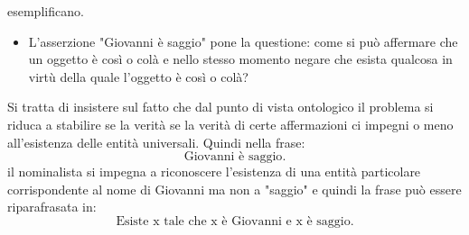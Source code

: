 \documentclass[a4paper,12pt]{article}
\begin{document}
esemplificano.
\begin{itemize}
    \item L'asserzione "Giovanni è saggio" pone la questione: come si può affermare che un oggetto è così o colà 
    e nello stesso momento negare che esista qualcosa in virtù della quale l'oggetto è così o colà?
\end{itemize}
Si tratta di insistere sul fatto che dal punto di vista ontologico il problema si riduca a stabilire se la verità
se la verità di certe affermazioni ci impegni o meno all'esistenza delle entità universali. Quindi nella frase:
\begin{equation}
    \mbox{Giovanni è saggio}.
    \label{eq:nominalismo_1}
\end{equation}
il nominalista si impegna a riconoscere l'esistenza di una entità particolare corrispondente al nome di Giovanni 
ma non a "saggio" e quindi la frase può essere riparafrasata in:
\begin{equation}
    \mbox{Esiste x tale che x è Giovanni e x è saggio}.
    \label{eq:nominalismo_2}
\end{equation}
\end{document}

